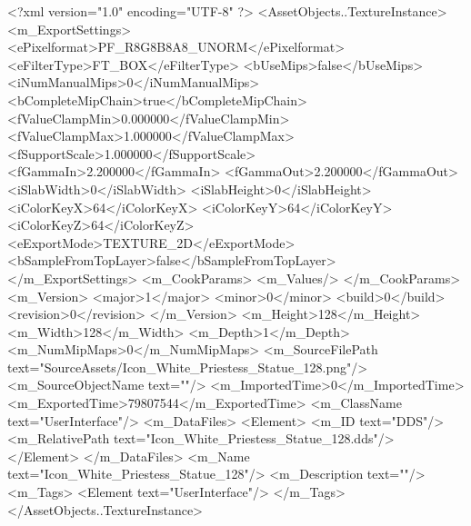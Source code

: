 <?xml version="1.0" encoding="UTF-8" ?>
<AssetObjects..TextureInstance>
	<m_ExportSettings>
		<ePixelformat>PF_R8G8B8A8_UNORM</ePixelformat>
		<eFilterType>FT_BOX</eFilterType>
		<bUseMips>false</bUseMips>
		<iNumManualMips>0</iNumManualMips>
		<bCompleteMipChain>true</bCompleteMipChain>
		<fValueClampMin>0.000000</fValueClampMin>
		<fValueClampMax>1.000000</fValueClampMax>
		<fSupportScale>1.000000</fSupportScale>
		<fGammaIn>2.200000</fGammaIn>
		<fGammaOut>2.200000</fGammaOut>
		<iSlabWidth>0</iSlabWidth>
		<iSlabHeight>0</iSlabHeight>
		<iColorKeyX>64</iColorKeyX>
		<iColorKeyY>64</iColorKeyY>
		<iColorKeyZ>64</iColorKeyZ>
		<eExportMode>TEXTURE_2D</eExportMode>
		<bSampleFromTopLayer>false</bSampleFromTopLayer>
	</m_ExportSettings>
	<m_CookParams>
		<m_Values/>
	</m_CookParams>
	<m_Version>
		<major>1</major>
		<minor>0</minor>
		<build>0</build>
		<revision>0</revision>
	</m_Version>
	<m_Height>128</m_Height>
	<m_Width>128</m_Width>
	<m_Depth>1</m_Depth>
	<m_NumMipMaps>0</m_NumMipMaps>
	<m_SourceFilePath text="SourceAssets/Icon_White_Priestess_Statue_128.png"/>
	<m_SourceObjectName text=""/>
	<m_ImportedTime>0</m_ImportedTime>
	<m_ExportedTime>79807544</m_ExportedTime>
	<m_ClassName text="UserInterface"/>
	<m_DataFiles>
		<Element>
			<m_ID text="DDS"/>
			<m_RelativePath text="Icon_White_Priestess_Statue_128.dds"/>
		</Element>
	</m_DataFiles>
	<m_Name text="Icon_White_Priestess_Statue_128"/>
	<m_Description text=""/>
	<m_Tags>
		<Element text="UserInterface"/>
	</m_Tags>
</AssetObjects..TextureInstance>
